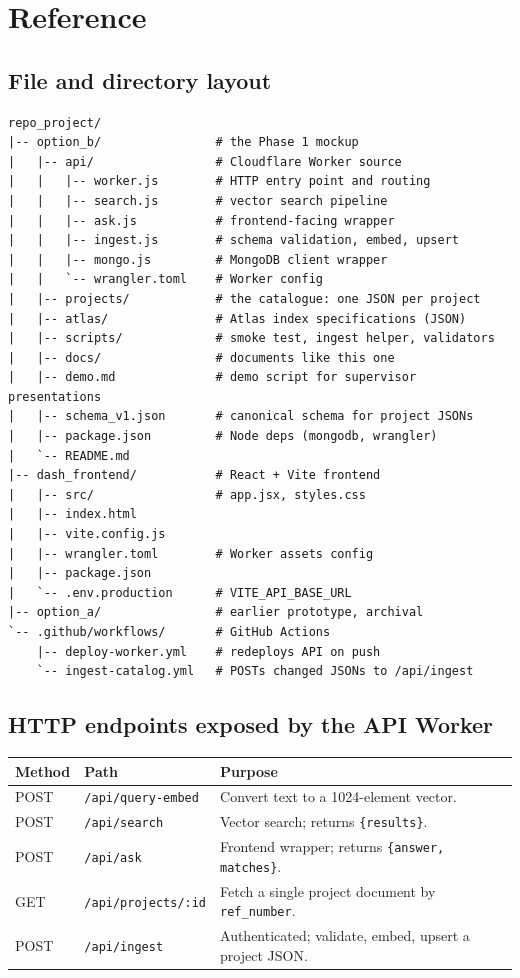 \documentclass[11pt,a4paper]{article}
\begin{document}
\section{Reference}

\subsection{File and directory layout}

\begin{lstlisting}[style=code]
repo_project/
|-- option_b/                # the Phase 1 mockup
|   |-- api/                 # Cloudflare Worker source
|   |   |-- worker.js        # HTTP entry point and routing
|   |   |-- search.js        # vector search pipeline
|   |   |-- ask.js           # frontend-facing wrapper
|   |   |-- ingest.js        # schema validation, embed, upsert
|   |   |-- mongo.js         # MongoDB client wrapper
|   |   `-- wrangler.toml    # Worker config
|   |-- projects/            # the catalogue: one JSON per project
|   |-- atlas/               # Atlas index specifications (JSON)
|   |-- scripts/             # smoke test, ingest helper, validators
|   |-- docs/                # documents like this one
|   |-- demo.md              # demo script for supervisor presentations
|   |-- schema_v1.json       # canonical schema for project JSONs
|   |-- package.json         # Node deps (mongodb, wrangler)
|   `-- README.md
|-- dash_frontend/           # React + Vite frontend
|   |-- src/                 # app.jsx, styles.css
|   |-- index.html
|   |-- vite.config.js
|   |-- wrangler.toml        # Worker assets config
|   |-- package.json
|   `-- .env.production      # VITE_API_BASE_URL
|-- option_a/                # earlier prototype, archival
`-- .github/workflows/       # GitHub Actions
    |-- deploy-worker.yml    # redeploys API on push
    `-- ingest-catalog.yml   # POSTs changed JSONs to /api/ingest
\end{lstlisting}

\subsection{HTTP endpoints exposed by the API Worker}

\begin{center}
\begin{tabularx}{\textwidth}{l l X}
\toprule
\textbf{Method} & \textbf{Path} & \textbf{Purpose} \\
\midrule
POST & \texttt{/api/query-embed} & Convert text to a 1024-element vector. \\
POST & \texttt{/api/search} & Vector search; returns \texttt{\{results\}}. \\
POST & \texttt{/api/ask} & Frontend wrapper; returns \texttt{\{answer, matches\}}. \\
GET & \texttt{/api/projects/:id} & Fetch a single project document by \texttt{ref\_number}. \\
POST & \texttt{/api/ingest} & Authenticated; validate, embed, upsert a project JSON. \\
\bottomrule
\end{tabularx}
\end{center}
\end{document}
